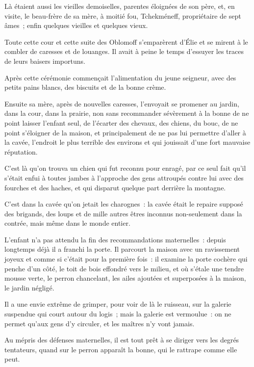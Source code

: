 \documentclass[french,twoside]{book} %
\begin{document}
Là étaient aussi les vieilles demoiselles, parentes éloignées de son père, et, en visite, le beau-frère de sa mère, à moitié fou, Tchekméneff, propriétaire de sept âmes ; enfin quelques vieilles et quelques vieux.\par
Toute cette cour et cette suite des Oblomoff s’emparèrent d’Élie et se mirent à le combler de caresses et de louanges. Il avait à peine le temps d’essuyer les traces de leurs baisers importuns.\par
Après cette cérémonie commençait l’alimentation du jeune seigneur, avec des petits pains blancs, des biscuits et de la bonne crème.\par
Ensuite sa mère, après de nouvelles caresses, l’envoyait se promener au jardin, dans la cour, dans la prairie, non sans recommander sévèrement à la bonne de ne point laisser l’enfant seul, de l’écarter des chevaux, des chiens, du bouc, de ne point s’éloigner de la maison, et principalement de ne pas lui permettre d’aller à la cavée, l’endroit le plus terrible des environs et qui jouissait d’une fort mauvaise réputation.\par
C’est là qu’on trouva un chien qui fut reconnu pour enragé, par ce seul fait qu’il s’était enfui à toutes jambes à l’approche des gens attroupés contre lui avec des fourches et des haches, et qui disparut quelque part derrière la montagne.\par
C’est dans la cavée qu’on jetait les charognes : la cavée était le repaire supposé des brigands, des loups et de mille autres êtres inconnus non-seulement dans la contrée, mais même dans le monde entier.\par
L’enfant n’a pas attendu la fin des recommandations maternelles : depuis longtemps déjà il a franchi la porte. Il parcourt la maison avec un ravissement joyeux et comme si c’était pour la première fois : il examine la porte cochère qui penche d’un côté, le toit de bois effondré vers le milieu, et où s’étale une tendre mousse verte, le perron chancelant, les ailes ajoutées et superposées à la maison, le jardin négligé.\par
Il a une envie extrême de grimper, pour voir de là le ruisseau, sur la galerie suspendue qui court autour du logis ; mais la galerie est vermoulue : on ne permet qu’aux gens d’y circuler, et les maîtres n’y vont jamais.\par
Au mépris des défenses maternelles, il est tout prêt à se diriger vers les degrés tentateurs, quand sur le perron apparaît la bonne, qui le rattrape comme elle peut.\par
\end{document}
